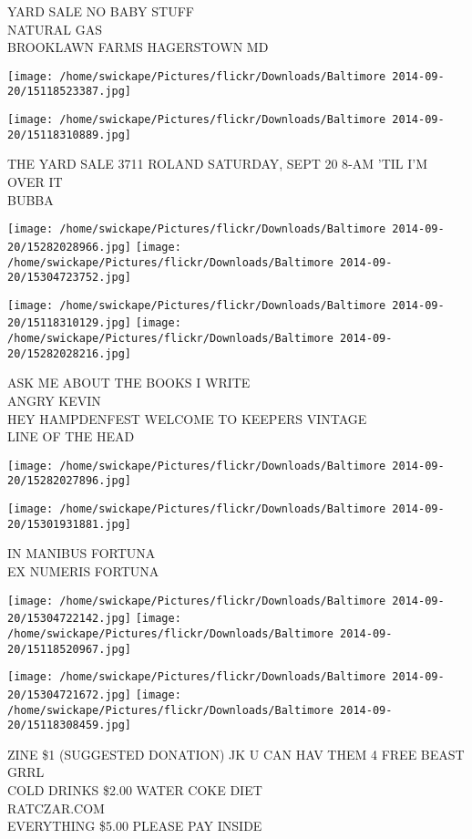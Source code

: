 \documentclass[10pt,letterpaper]{article}
\begin{document}
YARD SALE NO BABY STUFF\\
NATURAL GAS\\
BROOKLAWN FARMS HAGERSTOWN MD
\pagebreak

\texttt{[image: /home/swickape/Pictures/flickr/Downloads/Baltimore 2014-09-20/15118523387.jpg]}

\vspace{0.25in}
\texttt{[image: /home/swickape/Pictures/flickr/Downloads/Baltimore 2014-09-20/15118310889.jpg]}

THE YARD SALE 3711 ROLAND SATURDAY, SEPT 20 8{-}AM 'TIL I'M OVER IT\\
BUBBA
\pagebreak

\texttt{[image: /home/swickape/Pictures/flickr/Downloads/Baltimore 2014-09-20/15282028966.jpg]}
\texttt{[image: /home/swickape/Pictures/flickr/Downloads/Baltimore 2014-09-20/15304723752.jpg]}

\texttt{[image: /home/swickape/Pictures/flickr/Downloads/Baltimore 2014-09-20/15118310129.jpg]}
\texttt{[image: /home/swickape/Pictures/flickr/Downloads/Baltimore 2014-09-20/15282028216.jpg]}

ASK ME ABOUT THE BOOKS I WRITE\\
ANGRY KEVIN\\
HEY HAMPDENFEST WELCOME TO KEEPERS VINTAGE\\
LINE OF THE HEAD
\pagebreak

\texttt{[image: /home/swickape/Pictures/flickr/Downloads/Baltimore 2014-09-20/15282027896.jpg]}

\vspace{0.25in}
\texttt{[image: /home/swickape/Pictures/flickr/Downloads/Baltimore 2014-09-20/15301931881.jpg]}

IN MANIBUS FORTUNA\\
EX NUMERIS FORTUNA
\pagebreak

\texttt{[image: /home/swickape/Pictures/flickr/Downloads/Baltimore 2014-09-20/15304722142.jpg]}
\texttt{[image: /home/swickape/Pictures/flickr/Downloads/Baltimore 2014-09-20/15118520967.jpg]}

\texttt{[image: /home/swickape/Pictures/flickr/Downloads/Baltimore 2014-09-20/15304721672.jpg]}
\texttt{[image: /home/swickape/Pictures/flickr/Downloads/Baltimore 2014-09-20/15118308459.jpg]}

ZINE \$1 (SUGGESTED DONATION) JK U CAN HAV THEM 4 FREE BEAST GRRL\\
COLD DRINKS \$2.00 WATER COKE DIET\\
RATCZAR.COM\\
EVERYTHING \$5.00 PLEASE PAY INSIDE
\pagebreak
\end{document}
